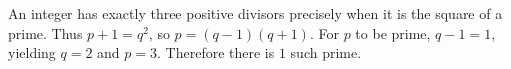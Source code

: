 An integer has exactly three positive divisors precisely when it is the square of a prime. Thus $p+1=q^2$, so $p=(q-1)(q+1)$. For $p$ to be prime, $q-1=1$, yielding $q=2$ and $p=3$. Therefore there is $\boxed1$ such prime.
